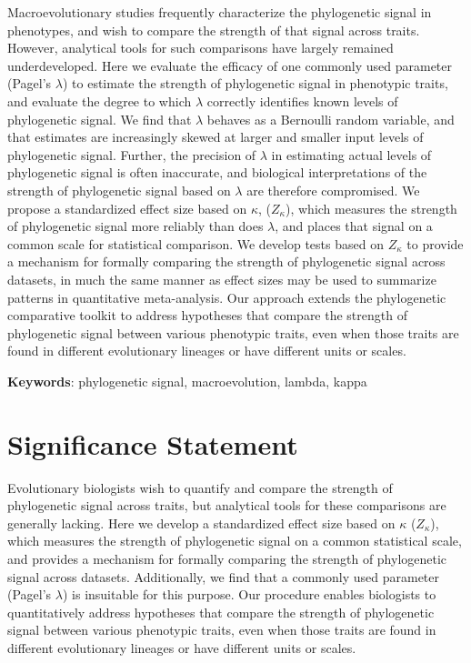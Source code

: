 \documentclass[
]{article}
\begin{document}
Macroevolutionary studies frequently characterize the phylogenetic
signal in phenotypes, and wish to compare the strength of that signal
across traits. However, analytical tools for such comparisons have
largely remained underdeveloped. Here we evaluate the efficacy of one
commonly used parameter (Pagel's \(\lambda\)) to estimate the strength
of phylogenetic signal in phenotypic traits, and evaluate the degree to
which \(\lambda\) correctly identifies known levels of phylogenetic
signal. We find that \(\lambda\) behaves as a Bernoulli random variable,
and that estimates are increasingly skewed at larger and smaller input
levels of phylogenetic signal. Further, the precision of \(\lambda\) in
estimating actual levels of phylogenetic signal is often inaccurate, and
biological interpretations of the strength of phylogenetic signal based
on \(\lambda\) are therefore compromised. We propose a standardized
effect size based on \(\kappa\), (\(Z_\kappa\)), which measures the
strength of phylogenetic signal more reliably than does \(\lambda\), and
places that signal on a common scale for statistical comparison. We
develop tests based on \(Z_\kappa\) to provide a mechanism for formally
comparing the strength of phylogenetic signal across datasets, in much
the same manner as effect sizes may be used to summarize patterns in
quantitative meta-analysis. Our approach extends the phylogenetic
comparative toolkit to address hypotheses that compare the strength of
phylogenetic signal between various phenotypic traits, even when those
traits are found in different evolutionary lineages or have different
units or scales. \hfill\break

\textbf{Keywords}: phylogenetic signal, macroevolution, lambda, kappa

\newpage

\hypertarget{significance-statement}{%
\section{Significance Statement}\label{significance-statement}}

Evolutionary biologists wish to quantify and compare the strength of
phylogenetic signal across traits, but analytical tools for these
comparisons are generally lacking. Here we develop a standardized effect
size based on \(\kappa\) (\(Z_\kappa\)), which measures the strength of
phylogenetic signal on a common statistical scale, and provides a
mechanism for formally comparing the strength of phylogenetic signal
across datasets. Additionally, we find that a commonly used parameter
(Pagel's \(\lambda\)) is insuitable for this purpose. Our procedure
enables biologists to quantitatively address hypotheses that compare the
strength of phylogenetic signal between various phenotypic traits, even
when those traits are found in different evolutionary lineages or have
different units or scales.
\end{document}
